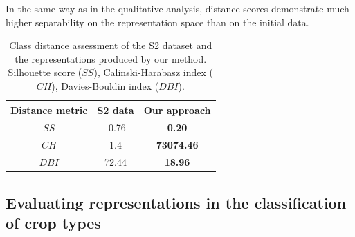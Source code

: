 \documentclass[journal,article,submit,pdftex,moreauthors]{Definitions/mdpi}
\begin{document}
In the same way as in the qualitative analysis, distance scores demonstrate much higher separability on the representation space than on the initial data.
\begin{table}[H]
	\centering
	\caption{Class distance assessment of the S2 dataset and the representations produced by our method. Silhouette score ($SS$), Calinski-Harabasz index ($CH$), Davies-Bouldin index ($DBI$).}
	\begin{tabular}{c|c|c}
		\hline
		Distance metric & S2 data & Our approach \\
		\hline  	
		$SS$ & -0.76 & \textbf{0.20} \\
        $CH$ & 1.4 & \textbf{73074.46} \\
		$DBI$ & 72.44  & \textbf{18.96} \\ 
		\hline
	\end{tabular}
	\label{distance_metrics_results}
\end{table}

\subsection{Evaluating representations in the classification of crop types}\label{results_section}

\end{document}
